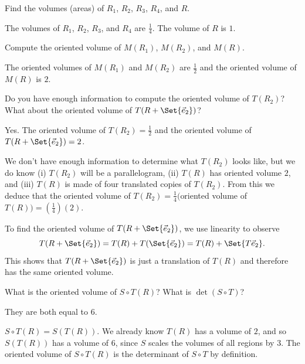 \documentclass{problemset}
\begin{document}
	\begin{parts}
		\item Find the volumes (areas) of $R_1$, $R_2$, $R_3$, $R_4$, and $R$.
			\begin{solution}
				The volumes of $R_1$, $R_2$, $R_3$, and $R_4$ are $\tfrac{1}{4}$. The
				volume of $R$ is $1$.
			\end{solution}
		\item Compute the oriented volume of $M(R_1)$, $M(R_2)$, and $M(R)$.
			\begin{solution}
				The oriented volumes of $M(R_1)$ and $M(R_2)$ are $\tfrac{1}{2}$ and the oriented volume of
				$M(R)$ is $2$. 
			\end{solution}
		\item Do you have enough information to compute the oriented volume of $T(R_2)$? What about the oriented volume of $T(R+\Set{\yhat})$?
			\begin{solution}
				Yes. The oriented volume of $T(R_2)=\tfrac{1}{2}$ and the oriented volume of $T(R+\Set{\vec e_2})=2$.
				
				We don't have enough information to determine what $T(R_2)$ looks like, but we do know (i) $T(R_2)$ 
				will be a parallelogram, (ii) $T(R)$ has oriented volume $2$, and (iii) $T(R)$ is made of
				four translated copies of $T(R_2)$. From this we deduce that the oriented volume of $T(R_2)=\tfrac{1}{4}\big($oriented
				volume of $T(R)\big)=(\tfrac{1}{4})(2)$.

				To find the oriented volume of $T(R+\Set{\yhat})$, we use linearity to observe
				\[
					T(R+\Set{\yhat})=T(R)+T(\Set{\yhat}) = T(R)+\Set{T\yhat}.
				\]
				This shows that $T(R+\Set{\yhat})$ is just a translation of $T(R)$ and therefore has the same oriented volume.
			\end{solution}
%
		\item What is the oriented volume of $S\circ T(R)$? What is $\det(S\circ T)$?
			\begin{solution}
				They are both equal to $6$.

				$S\circ T(R)=S(T(R))$. We already know $T(R)$ has a volume
				of $2$, and so $S(T(R))$ has a volume of $6$, since $S$ scales
				the volumes of all regions by $3$. The oriented volume of $S\circ T(R)$
				is the determinant of $S\circ T$ by definition.
			\end{solution}
	\end{parts}
\end{document}
